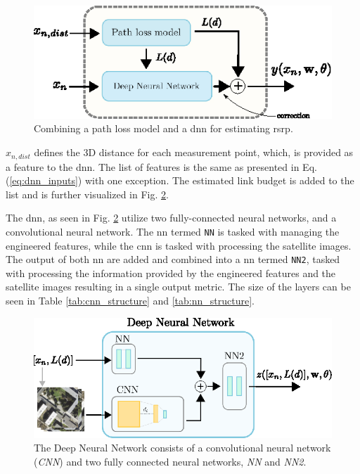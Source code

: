 \begin{figure}
    \centering
    \includegraphics[width=\textwidth]{chapters/part_pathloss/model_aided_paper/combined_model_approach.eps}
    \caption{Combining a path loss model and a \gls{dnn} for estimating \gls{rsrp}.}
    \label{fig:combined_model_approach}
\end{figure}

 $x_{n,dist}$ defines the 3D distance for each measurement point, which, is provided as a feature to the \gls{dnn}. The list of features is the same as presented in Eq. (\ref{eq:dnn_inputs}) with one exception. The estimated link budget is added to the list and is further visualized in Fig. \ref{fig:satellite_model_setup_v2}.
 
The \gls{dnn}, as seen in Fig. \ref{fig:satellite_model_setup_v2} utilize two fully-connected neural networks, and a convolutional neural network. The \gls{nn} termed \texttt{NN} is tasked with managing the engineered features, while the \gls{cnn} is tasked with processing the satellite images. The output of both \gls{nn} are added and combined into a \gls{nn} termed \texttt{NN2}, tasked with processing the information provided by the engineered features and the satellite images resulting in a single output metric. The size of the layers can be seen in Table \ref{tab:cnn_structure} and \ref{tab:nn_structure}.

\begin{figure}
    \centering
    \includegraphics{chapters/part_pathloss/model_aided_paper/setup_model.eps}
    \caption{The Deep Neural Network consists of a convolutional neural network (\emph{CNN}) and two fully connected neural networks, \emph{NN} and \emph{NN2}.}
    \label{fig:satellite_model_setup_v2}
\end{figure}

